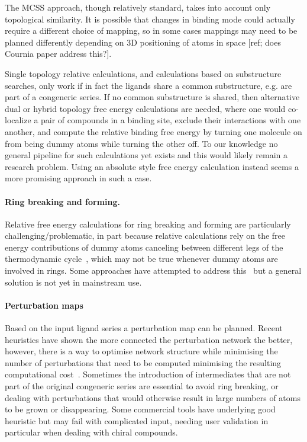 \documentclass[9pt,bestpractices]{livecoms}
\begin{document}
The MCSS approach, though relatively standard, takes into account only topological similarity.
It is possible that changes in binding mode could actually require a different choice of mapping, so in some cases mappings may need to be planned differently depending on 3D positioning of atoms in space [ref; does Cournia paper address this?].

Single topology relative calculations, and calculations based on substructure searches, only work if in fact the ligands share a common substructure, e.g. are part of a congeneric series.
If no common substructure is shared, then alternative dual or hybrid topology free energy calculations are needed, where one would co-localize a pair of compounds in a binding site, exclude their interactions with one another, and compute the relative binding free energy by turning one molecule on from being dummy atoms while turning the other off.
To our knowledge no general pipeline for such calculations yet exists and this would likely remain a research problem. Using an absolute style free energy calculation instead seems a more promising approach in such a case. 

\paragraph{Ring breaking and forming.} Relative free energy calculations for ring breaking and forming are particularly challenging/problematic, in part because relative calculations rely on the free energy contributions of dummy atoms canceling between different legs of the thermodynamic cycle~\cite{}, which may not be true whenever dummy atoms are involved in rings.
Some approaches have attempted to address this~\cite{clark2019relative} but a general solution is not yet in mainstream use.

\paragraph{Perturbation maps}
Based on the input ligand series a perturbation map can be planned. Recent heuristics have shown the more connected the perturbation network the better, however, there is a way to optimise network structure while minimising the number of perturbations that need to be computed minimising the resulting computational cost~\cite{yang2019optimal}. Sometimes the introduction of intermediates that are not part of the original congeneric series are essential to avoid ring breaking, or dealing with perturbations that would otherwise result in large numbers of atoms to be grown or disappearing. Some commercial tools have underlying good heuristic but may fail with complicated input, needing user validation in particular when dealing with chiral compounds. 
\end{document}
